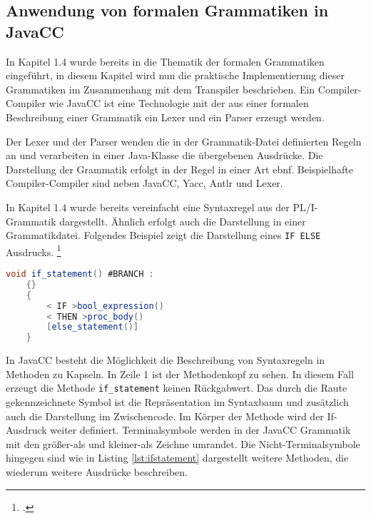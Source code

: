      
\pagebreak
\subsection{Anwendung von formalen Grammatiken in JavaCC}

In Kapitel 1.4 wurde bereits in die Thematik der formalen Grammatiken eingeführt, in diesem Kapitel wird nun die praktische Implementierung dieser Grammatiken im Zusammenhang mit dem Transpiler beschrieben.
Ein Compiler-Compiler wie JavaCC ist eine Technologie mit der aus einer formalen Beschreibung einer Grammatik ein Lexer und ein Parser erzeugt werden. 

Der Lexer und der Parser wenden die in der Grammatik-Datei definierten Regeln an und verarbeiten in einer Java-Klasse die übergebenen Ausdrücke.
Die Darstellung der Grammatik erfolgt in der Regel in einer Art \ac{ebnf}. 
Beispielhafte Compiler-Compiler sind neben JavaCC, Yacc, Antlr und Lexer.


In Kapitel 1.4 wurde bereits vereinfacht eine Syntaxregel aus der PL/I-Grammatik dargestellt. Ähnlich erfolgt auch die Darstellung in einer Grammatikdatei. Folgendes Beispiel zeigt die Darstellung eines \verb+IF ELSE+ Ausdrucks. 
\footcite[Vgl. ][]{javaccdoku}


\begin{lstlisting}[language=Java, caption=If Statement aus der Grammatikdatei, label={lst:ifstatement}]
	void if_statement() #BRANCH :
	{}
	{
		< IF >bool_expression()
		< THEN >proc_body()
		[else_statement()]
	}
\end{lstlisting}

In JavaCC besteht die Möglichkeit die Beschreibung von Syntaxregeln in Methoden zu Kapseln.
In Zeile 1 ist der Methodenkopf zu sehen. In diesem Fall erzeugt die Methode \verb+if_statement+ keinen Rückgabwert.
Das durch die Raute gekennzeichnete Symbol ist die Repräsentation im Syntaxbaum und zusätzlich auch die Darstellung im Zwischencode.
Im Körper der Methode wird der If-Ausdruck weiter definiert. Terminalsymbole werden in der JavaCC Grammatik mit den größer-als und kleiner-als Zeichne umrandet. Die Nicht-Terminalsymbole hingegen sind wie in Listing \ref{lst:ifstatement} dargestellt weitere Methoden, die wiederum weitere Ausdrücke beschreiben.

